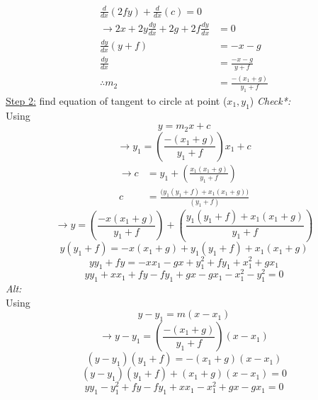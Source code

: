 \begin{solution}
\begin{align*}
			\frac{d}{dx}\left( 2fy \right)
			+
			\frac{d}{dx}\left( c \right)
			= 0
			\\
		\rightarrow
		2x
		+
		2y \frac{dy}{dx}
		+
		2g
		+
		2f \frac{dy}{dx}
			&= 0	
			\\
		\frac{dy}{dx} (y+f)
			&=
			-x - g
			\\
		\frac{dy}{dx} 
			&=
			\frac{-x - g}{y + f}
			\\
		\therefore
		m_{2}
			&=
			\frac{-(x_{1} + g)}{y_{1} + f}
	\end{align*}
	\underline{Step 2:} find equation of tangent to circle at point
	($x_{1},y_{1}$)
	\newline
	\textit{Check*:} 
	\\
	Using
	\[
		y = m_{2}x + c
	\]
	\[
		\rightarrow
		y_{1}
		= 
		\left( \frac{-(x_{1} + g)}{y_{1} + f} \right)x_{1}
		+ c
	\]
	\begin{align*}
		\rightarrow
		c
			&= 
			y_{1} 
			+ 
			\left( \frac{x_{1}(x_{1} + g)}{y_{1} + f} \right)
			\\
		c
			&= 
			\frac{
				\big(
					y_{1}(y_{1} + f) + x_{1}(x_{1} + g)
				\big)
			}{ 
				(y_{1} + f) 
			}
	\end{align*}
	\[
		\rightarrow
		y
		=
		\left( \frac{-x (x_{1} + g)}{y_{1} + f} \right)
		+
		\left(
		\frac{
				y_{1}(y_{1} + f) + x_{1}(x_{1} + g)
			}{
				y_{1} + f
			}
		\right)
	\]
	\[
		y (y_{1} + f)
		=
		-x (x_{1} + g)
		+
		y_{1}(y_{1} + f) 
		+ 
		x_{1}(x_{1} + g)
	\]
	\[
		y y_{1} + fy
		=
		-x x_{1} - gx
		+
		y_{1}^{2} + f y_{1}
		+ 
		x_{1}^{2} + g x_{1}
	\]
	\begin{equation}
		y y_{1} + x x_{1}
		+ fy - f y_{1}
		+ gx - g x_{1}
		- x_{1}^{2} 
		- y_{1}^{2}  
		= 0
		\label{eq:M8_circ_q07_expanded_tangent_1}
	\end{equation}
	\textit{Alt: }
	\\
	Using
	\[
		y - y_{1} = m (x - x_{1})
	\]
	\[
		\rightarrow
		y - y_{1}
		= 
		\left( \frac{-(x_{1} + g)}{y_{1} + f} \right)
		(x - x_{1})
	\]
	\[
		(y - y_{1})(y_{1} + f)
		= 
		-(x_{1} + g)(x - x_{1})
	\]
	\[
		(y - y_{1})(y_{1} + f)
		+
		(x_{1} + g)(x - x_{1})
		= 0
	\]
	\[
		y y_{1} - y_{1}^{2} + fy - fy_{1}
		+ 
		x x_{1} - x_{1}^{2} + gx - gx_{1}
		= 0 
	\]
	\begin{equation}

\end{equation}
\end{solution}
